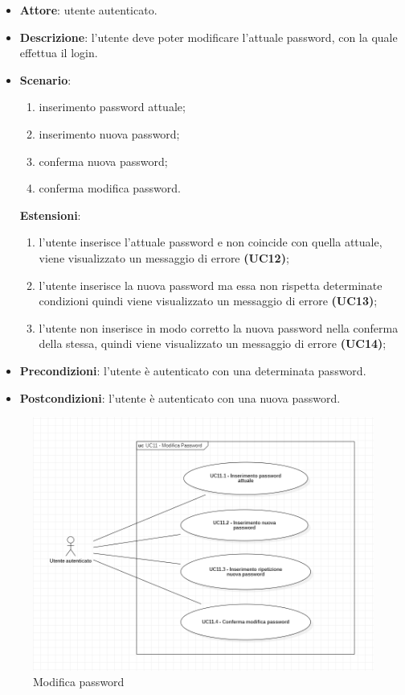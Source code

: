 \begin{itemize}
    \item \textbf{Attore}: utente autenticato.
    \item \textbf{Descrizione}: l'utente deve poter modificare l'attuale password, con la quale effettua il login.
    \item \textbf{Scenario}:
    \begin{enumerate}
        \item inserimento password attuale;
        \item inserimento nuova password;
        \item conferma nuova password;
        \item conferma modifica password.
    \end{enumerate}
    \textbf{Estensioni}:
    \begin{enumerate}
        \item l'utente inserisce l'attuale password e non coincide con quella attuale, viene visualizzato un messaggio di errore \textbf{(UC12)};
        \item l'utente inserisce la nuova password ma essa non rispetta determinate condizioni quindi viene visualizzato un messaggio di errore \textbf{(UC13)};
        \item l'utente non inserisce in modo corretto la nuova password nella conferma della stessa, quindi viene visualizzato un messaggio di errore \textbf{(UC14)};
    \end{enumerate}

    \item \textbf{Precondizioni}: l'utente è autenticato con una determinata password.
    \item \textbf{Postcondizioni}: l'utente è autenticato con una nuova password.
\end{itemize}

\begin{figure}[!h]
    \includegraphics[width=15cm]{sezioni/Images/UC11_s.png}
    \centering
    \caption{Modifica password}
\end{figure}

